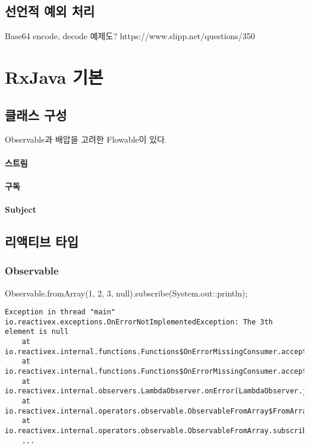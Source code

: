 \documentclass{book}
\begin{document}
\section{선언적 예외 처리}
Base64 encode, decode 예제도?
https://www.slipp.net/questions/350

\chapter{RxJava 기본}


\section{클래스 구성}
Observable과 배압을 고려한 Flowable이 있다.

\subsubsection{스트림}

\subsubsection{구독}

\subsubsection{Subject}

\section{리액티브 타입}
\subsection{Observable}


Observable.fromArray(1, 2, 3, null).subscribe(System.out::println);
\begin{verbatim}
Exception in thread "main" io.reactivex.exceptions.OnErrorNotImplementedException: The 3th element is null
	at io.reactivex.internal.functions.Functions$OnErrorMissingConsumer.accept(Functions.java:704)
	at io.reactivex.internal.functions.Functions$OnErrorMissingConsumer.accept(Functions.java:701)
	at io.reactivex.internal.observers.LambdaObserver.onError(LambdaObserver.java:74)
	at io.reactivex.internal.operators.observable.ObservableFromArray$FromArrayDisposable.run(ObservableFromArray.java:104)
	at io.reactivex.internal.operators.observable.ObservableFromArray.subscribeActual(ObservableFromArray.java:36)
	...
\end{verbatim}
\end{document}
